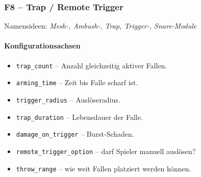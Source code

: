 \subsubsection{F8 – Trap / Remote Trigger}
Namensideen: \emph{Mesh-, Ambush-, Trap, Trigger-, Snare-Module}

\paragraph{Konfigurationsachsen}{}

\begin{itemize}
	\item \texttt{trap\_count} – Anzahl gleichzeitig aktiver Fallen.
	\item \texttt{arming\_time} – Zeit bis Falle scharf ist.
	\item \texttt{trigger\_radius} – Auslöseradius.
	\item \texttt{trap\_duration} – Lebensdauer der Falle.
	\item \texttt{damage\_on\_trigger} – Burst-Schaden.
	\item \texttt{remote\_trigger\_option} – darf Spieler manuell auslösen?
	\item \texttt{throw\_range} – wie weit Fallen platziert werden können.
\end{itemize}

